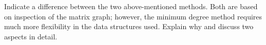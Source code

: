 \begin{exercise}
  Indicate a difference between the two above-mentioned methods. Both
  are based on inspection of the matrix graph; however, the minimum
  degree method requires much more flexibility in the data structures
  used. Explain why and discuss two aspects in detail.
\end{exercise}

